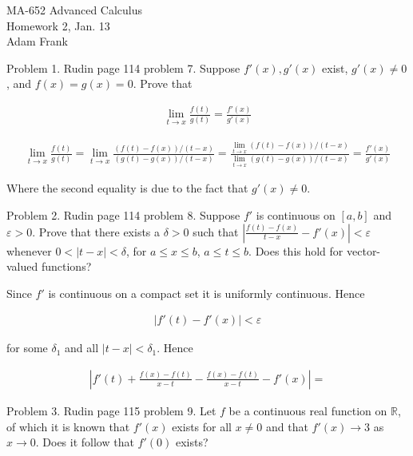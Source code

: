 \documentclass{article}
\begin{document}
  \begin{center} \Large
    MA-652 Advanced Calculus\\
    Homework 2, Jan. 13 \\
    Adam Frank
  \end{center}

  \vspace{1cm}

  {\Large \color{Sepia} Problem 1. Rudin page 114 problem 7. Suppose $f'(x),g'(x)$ exist, $g'(x)\ne 0$, and $f(x)=g(x)=0$.  Prove that

  \begin{align*}
    \lim_{t\to x}\frac{f(t)}{g(t)} = \frac{f'(x)}{g'(x)}
  \end{align*} }

  \vspace{1cm}

  \begin{align*}
    \lim_{t\to x}\frac{f(t)}{g(t)} = \lim_{t\to x}\frac{(f(t)-f(x))/(t-x)}{(g(t)-g(x))/(t-x)} = \frac{\lim_{t\to x}(f(t)-f(x))/(t-x)}{\lim_{t\to x}(g(t)-g(x))/(t-x)} = \frac{f'(x)}{g'(x)}
  \end{align*}

  Where the second equality is due to the fact that $g'(x)\ne 0$.

  \pagebreak

  {\Large \color{Sepia} Problem 2. Rudin page 114 problem 8. Suppose $f'$ is continuous on $[a,b]$ and $\varepsilon>0$.  Prove that there exists a $\delta>0$ such that $\left|\frac{f(t)-f(x)}{t-x}-f'(x)\right|<\varepsilon$ whenever $0<|t-x|<\delta$, for $a\leq x\leq b$, $a\leq t\leq b$.  Does this hold for vector-valued functions?}

  \vspace{1cm}

  Since $f'$ is continuous on a compact set it is uniformly continuous.  Hence

  \begin{align*}
    |f'(t)-f'(x)|<\varepsilon
  \end{align*}

  for some $\delta_1$ and all $|t-x|<\delta_1$.  Hence

  \begin{align*}
    \left|f'(t)+\frac{f(x)-f(t)}{x-t}-\frac{f(x)-f(t)}{x-t}-f'(x)\right| = 
  \end{align*}

  \pagebreak

  {\Large \color{Sepia} Problem 3. Rudin page 115 problem 9. Let $f$ be a continuous real function on $\mathbb R$, of which it is known that $f'(x)$ exists for all $x\ne 0$ and that $f'(x)\to 3$ as $x\to 0$.  Does it follow that $f'(0)$ exists?}
\end{document}
